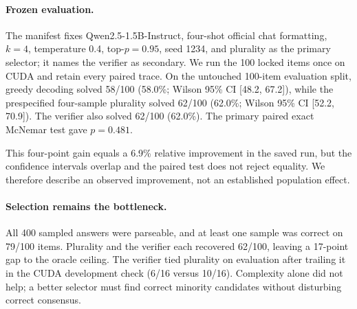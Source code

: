 \documentclass[11pt]{article}
\begin{document}
\begin{table}[t]
\centering
\caption{Development path and frozen evaluation counts. The legacy vote uses
$k=8$; all v1 vote rows use $k=4$. Development rows guided configuration
selection and must not be read as holdout estimates.}\label{tab:v1dev}
\small
{}
\end{table}

\paragraph{Frozen evaluation.} The manifest fixes
Qwen2.5-1.5B-Instruct, four-shot official chat formatting, $k=4$,
temperature 0.4, top-$p=0.95$, seed 1234, and plurality as the primary
selector; it names the verifier as secondary. We run the 100 locked items once
on CUDA and retain every paired trace.
On the untouched 100-item evaluation split, greedy decoding solved 58/100 (58.0\%; Wilson 95\% CI [48.2, 67.2]), while the prespecified four-sample plurality solved 62/100 (62.0\%; Wilson 95\% CI [52.2, 70.9]). The verifier also solved 62/100 (62.0\%). The primary paired exact McNemar test gave $p=0.481$.

This four-point gain equals a 6.9\% relative improvement in the saved run, but
the confidence intervals overlap and the paired test does not reject equality.
We therefore describe an observed improvement, not an established population
effect.

\paragraph{Selection remains the bottleneck.} All 400 sampled answers were
parseable, and at least one sample was correct on 79/100 items. Plurality and
the verifier each recovered 62/100, leaving a 17-point gap to the oracle
ceiling. The verifier tied plurality on evaluation after trailing it in the
CUDA development check (6/16 versus 10/16). Complexity alone did not help; a
better selector must find correct minority candidates without disturbing
correct consensus.
\end{document}
